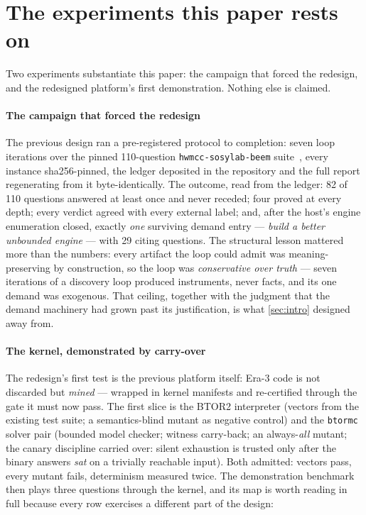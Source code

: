 
\section{The experiments this paper rests on}
\label{sec:status}

Two experiments substantiate this paper: the campaign that forced
the redesign, and the redesigned platform's first demonstration.
Nothing else is claimed.

\paragraph{The campaign that forced the redesign}
The previous design ran a pre-registered protocol to completion:
seven loop iterations over the pinned 110-question
\texttt{hwmcc-sosylab-beem} suite~\citep{niemetz2018btor2}, every
instance sha256-pinned, the ledger deposited in the repository and
the full report regenerating from it byte-identically. The outcome,
read from the ledger: 82 of 110 questions answered at least once and
never receded; four proved at every depth; every verdict agreed with
every external label; and, after the host's engine enumeration
closed, exactly \emph{one} surviving demand entry --- \emph{build a
better unbounded engine} --- with 29 citing questions. The
structural lesson mattered more than the numbers: every artifact the
loop could admit was meaning-preserving by construction, so the loop
was \emph{conservative over truth} --- seven iterations of a
discovery loop produced instruments, never facts, and its one demand
was exogenous. That ceiling, together with the judgment that the
demand machinery had grown past its justification, is what
\cref{sec:intro} designed away from.

\paragraph{The kernel, demonstrated by carry-over}
The redesign's first test is the previous platform itself: Era-3
code is not discarded but \emph{mined} --- wrapped in kernel
manifests and re-certified through the gate it must now pass. The
first slice is the BTOR2 interpreter (vectors from the existing test
suite; a semantics-blind mutant as negative control) and the
\texttt{btormc} solver pair (bounded model checker; witness
carry-back; an always-\textit{all} mutant; the canary discipline
carried over: silent exhaustion is trusted only after the binary
answers \textit{sat} on a trivially reachable input). Both admitted:
vectors pass, every mutant fails, determinism measured twice. The
demonstration benchmark then plays three questions through the
kernel, and its map is worth reading in full because every row
exercises a different part of the design:


